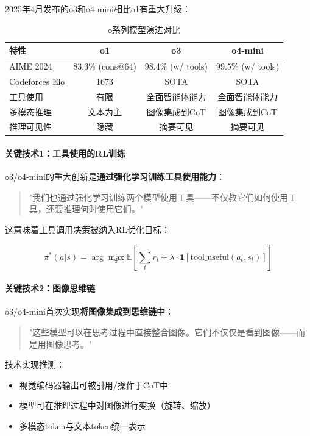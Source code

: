 \documentclass[12pt,a4paper]{article}
\begin{document}
2025年4月发布的o3和o4-mini相比o1有重大升级：

\begin{table}[H]
\centering
\caption{o系列模型演进对比}
\begin{tabular}{lccc}
\toprule
\textbf{特性} & \textbf{o1} & \textbf{o3} & \textbf{o4-mini} \\
\midrule
AIME 2024 & 83.3\% (cons@64) & 98.4\% (w/ tools) & 99.5\% (w/ tools) \\
Codeforces Elo & 1673 & SOTA & SOTA \\
工具使用 & 有限 & 全面智能体能力 & 全面智能体能力 \\
多模态推理 & 文本为主 & 图像集成到CoT & 图像集成到CoT \\
推理可见性 & 隐藏 & 摘要可见 & 摘要可见 \\
\bottomrule
\end{tabular}
\end{table}

\paragraph{关键技术1：工具使用的RL训练}

o3/o4-mini的重大创新是\textbf{通过强化学习训练工具使用能力}：

\begin{quote}
"我们也通过强化学习训练两个模型使用工具——不仅教它们如何使用工具，还要推理何时使用它们。"
\end{quote}

这意味着工具调用决策被纳入RL优化目标：

\begin{equation}
\pi^*(a|s) = \arg\max_\pi \mathbb{E}\left[\sum_t r_t + \lambda \cdot \mathbf{1}[\text{tool\_useful}(a_t, s_t)]\right]
\end{equation}

\paragraph{关键技术2：图像思维链}

o3/o4-mini首次实现\textbf{将图像集成到思维链中}：

\begin{quote}
"这些模型可以在思考过程中直接整合图像。它们不仅仅是看到图像——而是用图像思考。"
\end{quote}

技术实现推测：
\begin{itemize}
    \item 视觉编码器输出可被引用/操作于CoT中
    \item 模型可在推理过程中对图像进行变换（旋转、缩放）
    \item 多模态token与文本token统一表示
\end{itemize}
\end{document}
